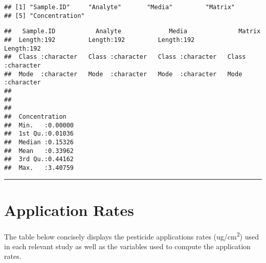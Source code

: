 \documentclass[
]{article}
\begin{document}
\begin{verbatim}
## [1] "Sample.ID"     "Analyte"       "Media"         "Matrix"       
## [5] "Concentration"
\end{verbatim}

\begin{verbatim}
##   Sample.ID           Analyte             Media              Matrix         
##  Length:192         Length:192         Length:192         Length:192        
##  Class :character   Class :character   Class :character   Class :character  
##  Mode  :character   Mode  :character   Mode  :character   Mode  :character  
##                                                                             
##                                                                             
##                                                                             
##  Concentration    
##  Min.   :0.00000  
##  1st Qu.:0.01036  
##  Median :0.15326  
##  Mean   :0.33962  
##  3rd Qu.:0.44162  
##  Max.   :3.40759
\end{verbatim}

\begin{center}\rule{0.5\linewidth}{0.5pt}\end{center}

\hypertarget{application-rates}{%
\section{\texorpdfstring{\textbf{Application
Rates}}{Application Rates}}\label{application-rates}}

The table below concisely displays the pesticide applications rates
(ug/cm\textsuperscript{2}) used in each relevant study as well as the
variables used to compute the application rates.
\end{document}
